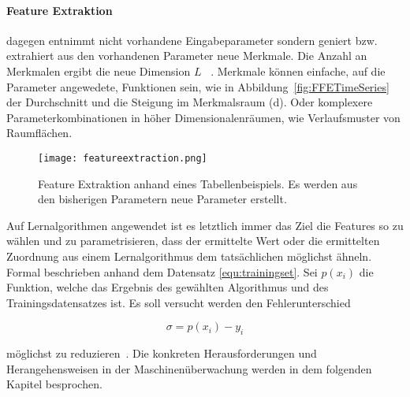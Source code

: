 \paragraph{Feature Extraktion} dagegen entnimmt nicht vorhandene Eingabeparameter sondern geniert bzw. extrahiert aus den vorhandenen Parameter neue Merkmale. Die Anzahl an Merkmalen ergibt die neue Dimension $L$ ~\cite{alpaydin2014introduction}.
Merkmale können einfache, auf die Parameter angewedete, Funktionen sein, wie in Abbildung\ \ref{fig:FFETimeSeries} der Durchschnitt und die Steigung im Merkmalsraum (d). Oder komplexere Parameterkombinationen in höher Dimensionalenräumen, wie Verlaufsmuster von Raumflächen.

\begin{figure}
  \centering
  \texttt{[image: featureextraction.png]}
  \caption{Feature Extraktion anhand eines Tabellenbeispiels. Es werden aus den bisherigen Parametern neue Parameter erstellt.}
  \label{fig:featureextraktion}
\end{figure}

Auf Lernalgorithmen angewendet ist es letztlich immer das Ziel die Features so zu wählen und zu parametrisieren, dass der ermittelte Wert oder die ermittelten Zuordnung aus einem Lernalgorithmus dem tatsächlichen möglichst ähneln. Formal beschrieben anhand dem Datensatz \ref{equ:trainingset}. Sei $p(x_i)$ die Funktion, welche das Ergebnis des gewählten Algorithmus und des Trainingsdatensatzes ist. Es soll versucht werden den Fehlerunterschied

\begin{equation}
  \sigma = p(x_i)-y_i
\end{equation}

möglichst zu reduzieren~\cite{gensler2015fast}. Die konkreten Herausforderungen und Herangehensweisen in der Maschinenüberwachung werden in dem folgenden Kapitel besprochen.
